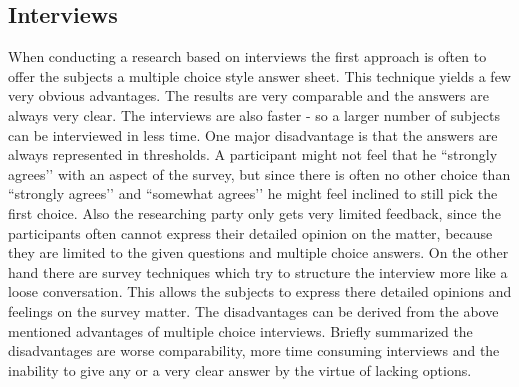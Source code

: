 \documentclass{sigchi}
\begin{document}
\subsection{Interviews}
When conducting a research based on interviews the first approach is often to offer the subjects a multiple choice style answer sheet. This technique yields a few very obvious advantages. The results are very comparable and the answers are always very clear. The interviews are also faster - so a larger number of subjects can be interviewed in less time. One major disadvantage is that the answers are always represented in thresholds. A participant might not feel that he ``strongly agrees’’ with an aspect of the survey, but since there is often no other choice than ``strongly agrees’’ and ``somewhat agrees’’ he might feel inclined to still pick the first choice. Also the researching party only gets very limited feedback, since the participants often cannot express their detailed opinion on the matter, because they are limited to the given questions and multiple choice answers. On the other hand there are survey techniques which try to structure the interview more like a loose conversation. This allows the subjects to express there detailed opinions and feelings on the survey matter. The disadvantages can be derived from the above mentioned advantages of multiple choice interviews. Briefly summarized the disadvantages are worse comparability, more time consuming interviews and the inability to give any or a very clear answer by the virtue of lacking options.
\end{document}
